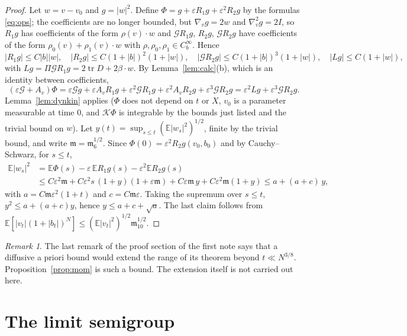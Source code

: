 \documentclass[11pt]{article}
\newcommand{\E}{\mathbb{E}}
\newcommand{\eps}{\varepsilon}
\newcommand{\cG}{\mathcal{G}}
\newcommand{\cK}{\mathcal{K}}
\newcommand{\fm}{\mathfrak{m}}
\theoremstyle{remark}
\newtheorem{remark}[theorem]{Remark}
\begin{document}
\begin{proof}
Let $w=v-v_0$ and $g=|w|^2$. Define $\Phi=g+\eps R_1g+\eps^2R_2g$ by the
formulas \eqref{eq:ops}; the coefficients are no longer bounded, but
$\nabla_vg=2w$ and $\nabla_v^2g=2I$, so $R_1g$ has coefficients of the form
$\rho(v)\cdot w$ and $\cG R_1g$, $R_2g$, $\cG R_2g$ have coefficients of
the form $\rho_0(v)+\rho_1(v)\cdot w$ with $\rho,\rho_0,\rho_1\in
C_b^\infty$. Hence
\[
  |R_1g|\le C|b||w|,\quad |R_2g|\le C(1+|b|)^2(1+|w|),\quad
  |\cG R_2g|\le C(1+|b|)^3(1+|w|),\quad |Lg|\le C(1+|w|),
\]
with $Lg=\Pi\cG R_1g=2\operatorname{tr}D+2\beta\cdot w$. By
Lemma~\ref{lem:calc}(b), which is an identity between coefficients,
\[
  (\eps\cG+A_v)\Phi=\eps\cG g+\eps A_vR_1g+\eps^2\cG R_1g+\eps^2A_vR_2g
    +\eps^3\cG R_2g=\eps^2Lg+\eps^3\cG R_2g .
\]
Lemma~\ref{lem:dynkin} applies ($\Phi$ does not depend on $t$ or $X$, $v_0$
is a parameter measurable at time $0$, and $\cK\Phi$ is integrable by the
bounds just listed and the trivial bound on $w$). Let $y(t)=\sup_{s\le
t}(\E|w_s|^2)^{1/2}$, finite by the trivial bound, and write
$\fm=\fm_6^{1/2}$. Since $\Phi(0)=\eps^2R_2g(v_0,b_0)$ and by
Cauchy--Schwarz, for $s\le t$,
\begin{align*}
  \E|w_s|^2&=\E\Phi(s)-\eps\,\E R_1g(s)-\eps^2\E R_2g(s)\\
  &\le C\eps^2\fm+C\eps^2s\,(1+y)(1+\eps\fm)+C\eps\fm\,y+C\eps^2\fm(1+y)
  \le a+(a+c)\,y,
\end{align*}
with $a=C\fm\eps^2(1+t)$ and $c=C\fm\eps$. Taking the supremum over $s\le t$,
$y^2\le a+(a+c)y$, hence $y\le a+c+\sqrt a$. The last claim follows from
$\E[|v_t|(1+|b_t|)^N]\le(\E|v_t|^2)^{1/2}\fm_{10}^{1/2}$.
\end{proof}

\begin{remark}
The last remark of the proof section of the first note says that a
diffusive a priori bound would extend the range of its theorem beyond
$t\ll N^{3/8}$. Proposition~\ref{prop:mom} is such a bound. The extension
itself is not carried out here.
\end{remark}

\section{The limit semigroup}
\end{document}
